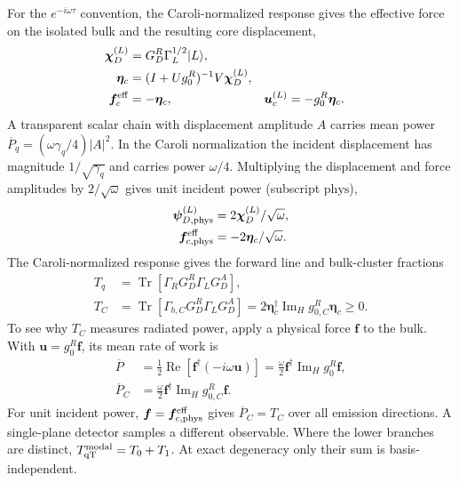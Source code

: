 \documentclass[10pt,aps,onecolumn,floatfix,notitlepage,nofootinbib,showkeys]{revtex4-2}
\newcommand{\vf}{\bm{f}}
\newcommand{\vu}{\bm{u}}
\newcommand{\vpsi}{\bm{\psi}}
\newcommand{\vchi}{\bm{\chi}}
\newcommand{\veta}{\bm{\eta}}
\newcommand{\qT}{\mathrm{qT}}
\newcommand{\Tr}{\operatorname{Tr}}
\newcommand{\ImH}{\operatorname{Im}_{\!H}}
\begin{document}
For the $e^{-i\omega\tau}$ convention, the Caroli-normalized response gives the effective force on the isolated bulk and the resulting core displacement,
\begin{align}
 \vchi_D^{(L)}&=G_D^R\Gamma_L^{1/2}|L\rangle,\\
 \veta_c&=(I+Ug_0^R)^{-1}V\vchi_D^{(L)},\\
 \vf_c^{\rm eff}&=-\veta_c,
 &\vu_c^{(L)}&=-g_0^R\veta_c.
 \label{eq:s5-caroli-source}
\end{align}
A transparent scalar chain with displacement amplitude $A$ carries mean power $\overline P_q=(\omega\gamma_q/4)|A|^2$. In the Caroli normalization the incident displacement has magnitude $1/\sqrt{\gamma_q}$ and carries power $\omega/4$. Multiplying the displacement and force amplitudes by $2/\sqrt{\omega}$ gives unit incident power (subscript $\mathrm{phys}$),
\begin{align}
 \vpsi_{D,{\rm phys}}^{(L)}&=2\vchi_D^{(L)}/\sqrt\omega,\\
 \vf_{c,{\rm phys}}^{\rm eff}&=-2\veta_c/\sqrt\omega.
 \label{eq:s5-physical-normalization}
\end{align}
The Caroli-normalized response gives the forward line and bulk-cluster fractions
\begin{align}
 T_q&=\Tr[\Gamma_RG_D^R\Gamma_LG_D^A],
 \label{eq:s5-line-transmission}\\
 T_C&=\Tr[\Gamma_{b,C}G_D^R\Gamma_LG_D^A]
 =2\veta_c^\dagger\ImH g_{0,C}^R\veta_c\ge0.
 \label{eq:s5-cluster-transmission}
\end{align}
To see why $T_C$ measures radiated power, apply a physical force $\vf$ to the bulk. With $\vu=g_0^R\vf$, its mean rate of work is
\begin{align}
 \overline P
 &=\tfrac12\operatorname{Re}[\vf^\dagger(-i\omega\vu)]
 =\tfrac{\omega}{2}\vf^\dagger\ImH g_0^R\vf,\\
 \overline P_C
 &=\tfrac{\omega}{2}\vf^\dagger\ImH g_{0,C}^R\vf.
 \label{eq:s5-work-identity}
\end{align}
For unit incident power, $\vf=\vf_{c,{\rm phys}}^{\rm eff}$ gives $\overline P_C=T_C$ over all emission directions. A single-plane detector samples a different observable. Where the lower branches are distinct, $T_{\qT}^{\rm modal}=T_0+T_1$. At exact degeneracy only their sum is basis-independent.
\end{document}
